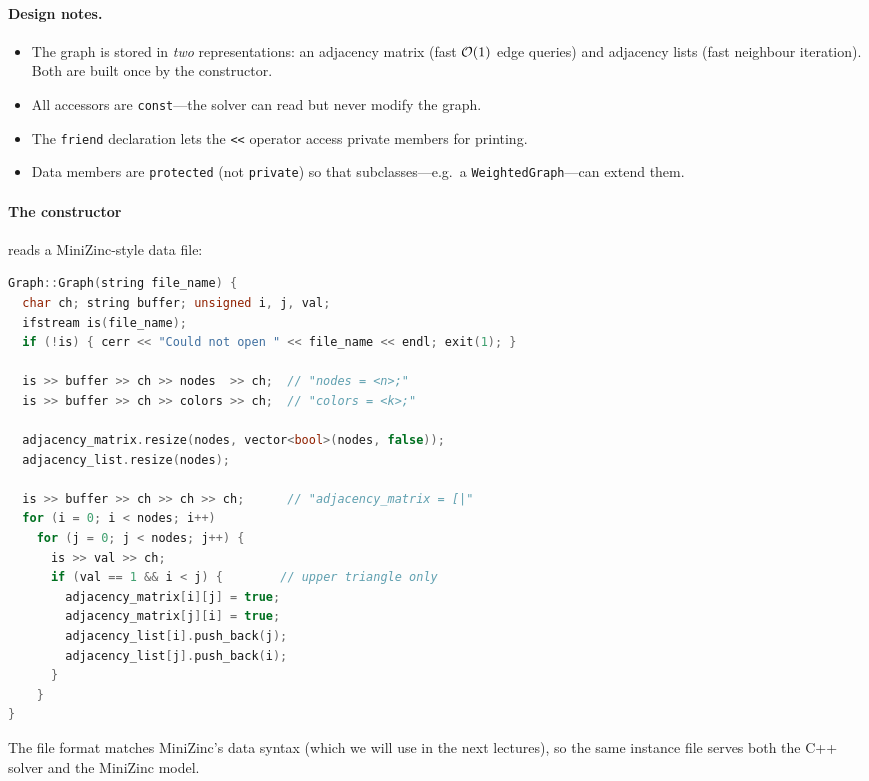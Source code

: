 \paragraph{Design notes.}
\begin{itemize}[nosep]
  \item The graph is stored in \emph{two} representations:
    an adjacency matrix (fast $\mathcal{O}\!\left(1\right)$ edge queries) and
    adjacency lists (fast neighbour iteration).
    Both are built once by the constructor.
  \item All accessors are \texttt{const}---the solver can read but
    never modify the graph.
  \item The \texttt{friend} declaration lets the \texttt{<\!<}
    operator access private members for printing.
  \item Data members are \texttt{protected} (not \texttt{private})
    so that subclasses---e.g.\ a \texttt{WeightedGraph}---can
    extend them.
\end{itemize}

\paragraph{The constructor} reads a MiniZinc-style data file:

\begin{lstlisting}[language=C++,
  caption={Constructor: reading the instance file.},
  label={lst:gc-constructor}]
Graph::Graph(string file_name) {
  char ch; string buffer; unsigned i, j, val;
  ifstream is(file_name);
  if (!is) { cerr << "Could not open " << file_name << endl; exit(1); }

  is >> buffer >> ch >> nodes  >> ch;  // "nodes = <n>;"
  is >> buffer >> ch >> colors >> ch;  // "colors = <k>;"

  adjacency_matrix.resize(nodes, vector<bool>(nodes, false));
  adjacency_list.resize(nodes);

  is >> buffer >> ch >> ch >> ch;      // "adjacency_matrix = [|"
  for (i = 0; i < nodes; i++)
    for (j = 0; j < nodes; j++) {
      is >> val >> ch;
      if (val == 1 && i < j) {        // upper triangle only
        adjacency_matrix[i][j] = true;
        adjacency_matrix[j][i] = true;
        adjacency_list[i].push_back(j);
        adjacency_list[j].push_back(i);
      }
    }
}
\end{lstlisting}

\noindent
The file format matches MiniZinc's data syntax (which we will
use in the next lectures), so the same instance file serves both
the C++ solver and the MiniZinc model.

